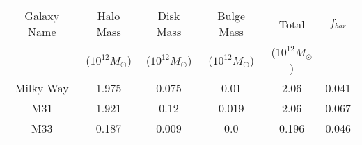 \documentclass{article}
\begin{document}
\begin{tabular}{ | c | c | c | c | c | c | }
\hline
    Galaxy Name&Halo Mass&Disk Mass&Bulge Mass&Total &$f_{bar}$\\
    & ($10^{12}M_\odot$) & ($10^{12}M_\odot$) & ($10^{12}M_\odot$) & ($10^{12}M_\odot$) & \\
    \hline
    Milky Way & 1.975 & 0.075 & 0.01 & 2.06 & 0.041\\
    M31 & 1.921 & 0.12 & 0.019 & 2.06 & 0.067\\
    M33 & 0.187 & 0.009 & 0.0 & 0.196 & 0.046\\
\hline
\end{tabular}
\end{document}
